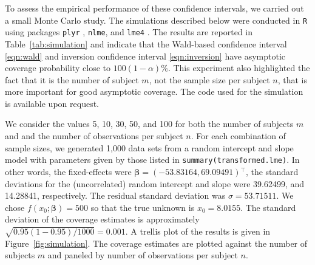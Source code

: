 \documentclass{article}\usepackage[]{graphicx}\usepackage[]{color}
\newcommand{\trans}{\ensuremath{^\top}}
\begin{document}
To assess the empirical performance of these confidence intervals, we carried out a small Monte Carlo study. The simulations described below were conducted in \texttt{R} using packages \texttt{plyr} \citep{wickham-plyr-2011}, \texttt{nlme}, and \texttt{lme4} \citep{bates-lme4-2014}.  The results are reported in Table~\ref{tab:simulation} and indicate that the Wald-based confidence interval \eqref{eqn:wald} and inversion confidence interval \eqref{eqn:inversion} have asymptotic coverage probability close to $100(1-\alpha)\%$.  This experiment also highlighted the fact that it is the number of subject $m$, not the sample size per subject $n$, that is more important for good asymptotic coverage.  The code used for the simulation is available upon request.

We consider the values 5, 10, 30, 50, and 100 for both the number of subjects $m$ and and the number of observations per subject $n$.  For each combination of sample sizes, we generated 1,000 data sets from a random intercept and slope model with parameters given by those listed in \texttt{summary(transformed.lme)}.  In other words, the fixed-effects were $\bm{\beta} = \left(-53.83164, 69.09491\right)\trans$, the standard deviations for the (uncorrelated) random intercept and slope were 39.62499, and 14.28841, respectively.  The residual standard deviation was $\sigma = 53.71511$.  We chose $f\left(x_0; \bm{\beta}\right) = 500$ so that the true unknown is $x_0 = 8.0155$.  The standard deviation of the coverage estimates is approximately $\sqrt{0.95\left(1-0.95\right)/1000} = 0.001$.  A trellis plot of the results is given in Figure~\ref{fig:simulation}.  The coverage estimates are plotted against the number of subjects $m$ and paneled by number of observations per subject $n$.
\end{document}
